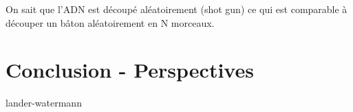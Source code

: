 \documentclass[11pt,a4paper]{article} %
\begin{document}
On sait que l'ADN est découpé aléatoirement (shot gun) ce qui est comparable à découper un bâton aléatoirement en N morceaux.  \\









\section{Conclusion - Perspectives} 
lander-watermann
\newpage     
\listoffigures
\newpage
\newpage

\nocite{*}

\end{document}
